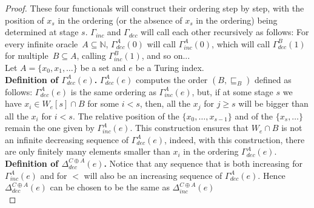 \documentclass{article}
\numberwithin{theorem}{section}
\newcommand{\NN}[0]{\mathbb{N}}
\begin{document}
\begin{proof}
These four functionals will construct their ordering step by step, with the position of $x_s$ in the ordering (or the absence of $x_s$ in the ordering) being determined at stage $s$. $\Gamma_{inc}$ and $\Gamma_{dec}$ will call each other recursively as follows: For every infinite oracle~$A \subseteq \NN$, $\Gamma^A_{dec}(0)$ will call $\Gamma^A_{inc}(0)$, which will call $\Gamma^B_{dec}(1)$ for multiple~$B \subseteq A$, calling $\Gamma^B_{inc}(1)$, and so on... \\

Let $A = \{x_0, x_1, \dots \}$ be a set and $e$ be a Turing index. \\

\textbf{Definition of $\Gamma^A_{dec}(e)$.}
$\Gamma^A_{dec}(e)$ computes the order $(B, \sqsubseteq_B)$ defined as follows: $\Gamma^A_{dec}(e)$ is the same ordering as $\Gamma^A_{inc}(e)$, but, if at some stage $s$ we have $x_i \in W_e[s] \cap B$ for some $i < s$, then, all the $x_j$ for $j \geq s$ will be bigger than all the $x_i$ for $i < s$. The relative position of the $\{x_0, \dots, x_{s-1}\}$ and of the $\{x_{s}, \dots \}$ remain the one given by $\Gamma^{A}_{inc}(e)$.
This construction ensures that $W_e \cap B$ is not an infinite decreasing sequence of $\Gamma^A_{dec}(e)$, indeed, with this construction, there are only finitely many elements smaller than $x_i$ in the ordering $\Gamma^A_{dec}(e)$. \\

\textbf{Definition of $\Delta^{C \oplus A}_{dec}(e)$.}
Notice that any sequence that is both increasing for $\Gamma_{inc}^A(e)$ and for $<$ will also be an increasing sequence of $\Gamma_{dec}^A(e)$. Hence $\Delta^{C \oplus A}_{dec}(e)$ can be chosen to be the same as $\Delta^{C \oplus A}_{inc}(e)$ \\


\end{proof}
\end{document}
